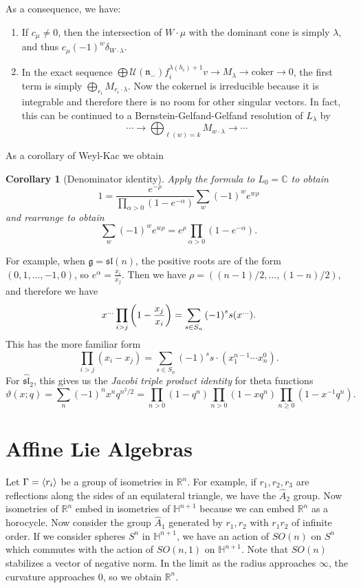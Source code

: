 \documentclass[leqno, openany]{memoir}
\newtheorem{cor}[thm]{Corollary}
\theoremstyle{definition}
\theoremstyle{remark}
\theoremstyle{plain}
\theoremstyle{definition}
\theoremstyle{remark}
\newcommand{\R}{\mathbb{R}}
\newcommand{\C}{\mathbb{C}}
\renewcommand{\H}{\mathbb{H}}
\newcommand{\mc}[1]{\mathcal{#1}}
\newcommand{\mf}[1]{\mathfrak{#1}}
\newcommand{\mr}[1]{\mathrm{#1}}
\newcommand{\wh}[1]{\widehat{#1}}
\begin{document}
As a consequence, we have: \begin{enumerate} \item If $c_{\mu} \neq 0$, then
    the intersection of $W \cdot \mu$ with the dominant cone is simply
    $\lambda$, and thus $c_{\mu} {(-1)}^w \delta_{W \cdot \lambda}$.  \item In
    the exact sequence $\bigoplus \mc{U}(\mf{n}_-) f_i^{\lambda(h_i)+1} v \to
    M_{\lambda} \to \mr{coker} \to 0$, the first term is simply
    $\bigoplus_{r_i} M_{r_i \cdot \lambda}$. Now the cokernel is irreducible
    because it is integrable and therefore there is no room for other singular
    vectors. In fact, this can be continued to a Bernstein-Gelfand-Gelfand
    resolution of $L_{\lambda}$ by \[ \cdots \to \bigoplus_{\ell(w)=k} M_{w
\cdot \lambda} \to \cdots \] \end{enumerate}

As a corollary of Weyl-Kac we obtain \begin{cor}[Denominator identity] Apply
    the formula to $L_0 = \C$ to obtain \[ 1 = \frac{e^{-\rho}}{\prod_{\alpha >
        0} (1-e^{-\alpha})} \sum_w {(-1)}^w e^{w \rho} \] and rearrange to
        obtain \[ \sum_w {(-1)}^w e^{w \rho} = e^{\rho} \prod_{\alpha > 0}
        (1-e^{-\alpha}). \] \end{cor}

For example, when $\mf{g} = \mf{sl}(n)$, the positive roots are of the form
$(0, 1, \ldots, -1, 0)$, so $e^{\alpha} = \frac{x_i}{x_j}$. Then we have $\rho
= ((n-1)/2, \ldots, (1-n)/2)$, and therefore we have \[ x^{\ldots} \prod_{i >
j} \qty(1-\frac{x_j}{x_i}) = \sum_{s \in S_n} {(-1)}^s s(x^{\ldots}). \] This
has the more familiar form \[ \prod_{i > j} (x_i - x_j) = \sum_{s\in S_n}
{(-1)}^s s \cdot (x_1^{n-1} \cdots x_n^0). \] For $\wh{\mf{sl}}_2$, this gives
us the \textit{Jacobi triple product identity} for theta functions \[
\vartheta(x;q) = \sum_n {(-1)}^n x^n q^{n^2/2} = \prod_{n > 0} (1-q^n)
\prod_{n>0} (1-xq^n) \prod_{n \geq 0} (1-x^{-1} q^n). \]

\section{Affine Lie Algebras}%

Let $\Gamma = \ev{r_i}$ be a group of isometries in $\R^n$. For example, if
$r_1, r_2, r_3$ are reflections along the sides of an equilateral triangle, we
have the $\wh{A}_2$ group. Now isometries of $\R^n$ embed in isometries of
$\H^{n+1}$ because we can embed $\R^n$ as a horocycle. Now consider the group
$\wh{A}_1$ generated by $r_1, r_2$ with $r_1 r_2$ of infinite order. If we
consider spheres $S^n$ in $\H^{n+1}$, we have an action of $SO(n)$ on $S^n$
which commutes with the action of $SO(n,1)$ on $\H^{n+1}$. Note that $SO(n)$
stabilizes a vector of negative norm. In the limit as the radius approaches
$\infty$, the curvature approaches $0$, so we obtain $\R^n$.
\end{document}
